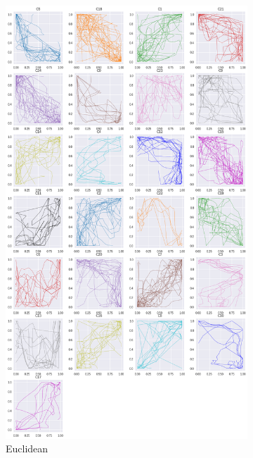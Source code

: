 \begin{figure}[h]
  \centering
  \begin{subfigure}[c]{0.3\linewidth}
    \includegraphics[width=\linewidth]{figs/clusters/CLU_AP_ALL[Ed].png}
    \caption{Euclidean}
  \end{subfigure}
  \hspace{.5em}
   \begin{subfigure}[c]{0.3\linewidth}

\end{subfigure}
\end{figure}
